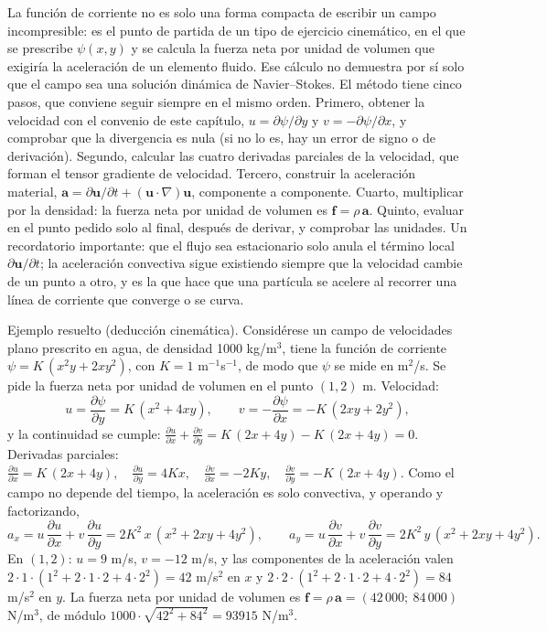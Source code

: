 \documentclass[10pt,openany]{book}
\begin{document}
La función de corriente no es solo una forma compacta de escribir un campo incompresible: es el punto de partida de un tipo de ejercicio cinemático, en el que se prescribe \(\psi(x, y)\) y se calcula la fuerza neta por unidad de volumen que exigiría la aceleración de un elemento fluido. Ese cálculo no demuestra por sí solo que el campo sea una solución dinámica de Navier--Stokes. El método tiene cinco pasos, que conviene seguir siempre en el mismo orden. Primero, obtener la velocidad con el convenio de este capítulo, \(u = \partial\psi/\partial y\) y \(v = -\partial\psi/\partial x\), y comprobar que la divergencia es nula (si no lo es, hay un error de signo o de derivación). Segundo, calcular las cuatro derivadas parciales de la velocidad, que forman el tensor gradiente de velocidad. Tercero, construir la aceleración material, \(\mathbf{a} = \partial\mathbf{u}/\partial t + (\mathbf{u}\cdot\nabla)\mathbf{u}\), componente a componente. Cuarto, multiplicar por la densidad: la fuerza neta por unidad de volumen es \(\mathbf{f} = \rho\,\mathbf{a}\). Quinto, evaluar en el punto pedido solo al final, después de derivar, y comprobar las unidades. Un recordatorio importante: que el flujo sea estacionario solo anula el término local \(\partial\mathbf{u}/\partial t\); la aceleración convectiva sigue existiendo siempre que la velocidad cambie de un punto a otro, y es la que hace que una partícula se acelere al recorrer una línea de corriente que converge o se curva.

Ejemplo resuelto (deducción cinemática). Considérese un campo de velocidades plano prescrito en agua, de densidad 1000 kg/m\(^3\), tiene la función de corriente \(\psi = K\,(x^{2}y + 2xy^{2})\), con \(K = 1\) m\(^{-1}\)s\(^{-1}\), de modo que \(\psi\) se mide en m\(^2\)/s. Se pide la fuerza neta por unidad de volumen en el punto \((1, 2)\) m. Velocidad:
\begin{equation}
u = \frac{\partial\psi}{\partial y} = K\,(x^{2} + 4xy),\qquad v = -\frac{\partial\psi}{\partial x} = -K\,(2xy + 2y^{2}), \label{eq:c12-ej-velocidad}
\end{equation}
y la continuidad se cumple: \(\frac{\partial u}{\partial x} + \frac{\partial v}{\partial y} = K\,(2x + 4y) - K\,(2x + 4y) = 0\). Derivadas parciales: \(\frac{\partial u}{\partial x} = K\,(2x + 4y),\quad \frac{\partial u}{\partial y} = 4Kx,\quad \frac{\partial v}{\partial x} = -2Ky,\quad \frac{\partial v}{\partial y} = -K\,(2x + 4y)\). Como el campo no depende del tiempo, la aceleración es solo convectiva, y operando y factorizando,
\begin{equation}
a_x = u\,\frac{\partial u}{\partial x} + v\,\frac{\partial u}{\partial y} = 2K^{2}\,x\,(x^{2} + 2xy + 4y^{2}),\qquad a_y = u\,\frac{\partial v}{\partial x} + v\,\frac{\partial v}{\partial y} = 2K^{2}\,y\,(x^{2} + 2xy + 4y^{2}). \label{eq:c12-ej-aceleracion}
\end{equation}
En \((1, 2)\): \(u = 9\) m/s, \(v = -12\) m/s, y las componentes de la aceleración valen \(2\cdot 1\cdot(1^2 + 2\cdot 1\cdot 2 + 4\cdot 2^2) = 42\) m/s\(^2\) en \(x\) y \(2\cdot 2\cdot(1^2 + 2\cdot 1\cdot 2 + 4\cdot 2^2) = 84\) m/s\(^2\) en \(y\). La fuerza neta por unidad de volumen es \(\mathbf{f} = \rho\,\mathbf{a} = (42\,000;\ 84\,000)\) N/m\(^3\), de módulo \(1000\cdot\sqrt{42^2 + 84^2} = 93915\) N/m\(^3\).
\end{document}
